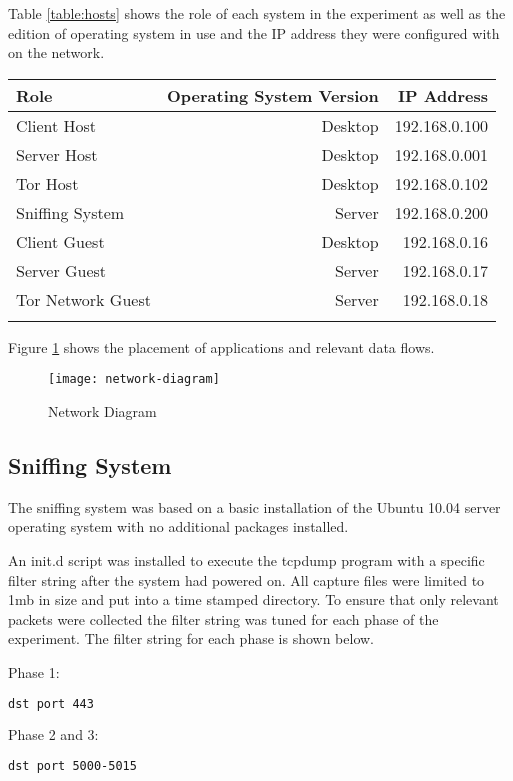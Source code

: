 Table \ref{table:hosts} shows the role of each system in the experiment as well
as the edition of operating system in use and the IP address they were
configured with on the network.

\begin{tabular}{lrr}
  \toprule
  Role & Operating System Version & IP Address\\
  \midrule
  Client Host & Desktop & 192.168.0.100\\
  Server Host & Desktop & 192.168.0.001\\
  Tor Host & Desktop & 192.168.0.102\\
  \midrule
  Sniffing System & Server & 192.168.0.200\\
  \midrule
  Client Guest & Desktop & 192.168.0.16\\
  Server Guest & Server & 192.168.0.17\\
  Tor Network Guest & Server & 192.168.0.18\\
  \botomrule
  \label{table:hosts}
\end{tabular}

Figure \ref{network-diagram} shows the placement of applications and relevant
data flows.

\begin{figure}[H]
  \centering\texttt{[image: network-diagram]}
  \caption{Network Diagram}
  \label{network-diagram}
\end{figure}

\subsection{Sniffing System}

The sniffing system was based on a basic installation of the Ubuntu 10.04 server
operating system with no additional packages installed.

An init.d script was installed to execute the tcpdump program with a specific
filter string after the system had powered on. All capture files were limited to
1mb in size and put into a time stamped directory. To ensure that only relevant
packets were collected the filter string was tuned for each phase of the
experiment. The filter string for each phase is shown below.

Phase 1:
\begin{lstlisting}[language=sh]
dst port 443
\end{lstlisting}

Phase 2 and 3:
\begin{lstlisting}[language=sh]
dst port 5000-5015
\end{lstlisting}

